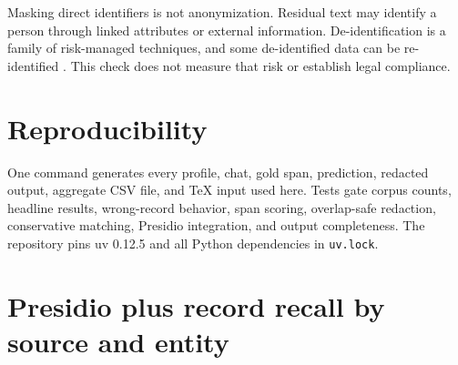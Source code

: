 \documentclass[11pt]{article}
\begin{document}
Masking direct identifiers is not anonymization. Residual text may identify a
person through linked attributes or external information. De-identification is
a family of risk-managed techniques, and some de-identified data can be
re-identified \citep{garfinkel2015}. This check does not measure that risk or
establish legal compliance.

\section*{Reproducibility}

One command generates every profile, chat, gold span, prediction, redacted
output, aggregate CSV file, and TeX input used here. Tests gate corpus counts,
headline results, wrong-record behavior, span scoring, overlap-safe redaction,
conservative matching, Presidio integration, and output completeness. The
repository pins uv 0.12.5 and all Python dependencies in \texttt{uv.lock}.

\clearpage
\appendix
\section*{Presidio plus record recall by source and entity}

\begin{table}[H]
\centering
\caption{Full-mention recall for Presidio plus record matching, pooled over the
canonical and stress suites. Known mentions derive from the resolved record;
novel mentions do not.}
\label{tab:strata}
\small

\end{table}

\small


\end{document}
